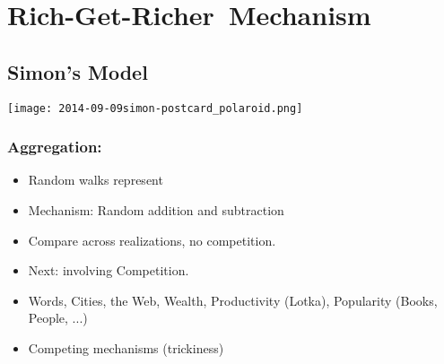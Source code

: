 


%
%




\section{Rich-Get-Richer\ Mechanism}

\subsection{Simon's Model}

\begin{frame}
  \texttt{[image: 2014-09-09simon-postcard\_polaroid.png]}
\end{frame}

\begin{frame}
  \frametitle{Aggregation:}
  
  \begin{block}{}
    \begin{itemize}
    \item<1-> 
      Random walks represent 
    \item<2-> 
      Mechanism: Random addition and subtraction
    \item<3-> 
      Compare across realizations, no competition.
    \item<4-> 
      Next: 
      involving Competition.
    \item<5-> 
       Words, Cities, the Web, Wealth, Productivity (Lotka), Popularity (Books, People, ...) 
    \item<6-> 
      Competing mechanisms (trickiness)
    \end{itemize}
  \end{block}

\end{frame}


